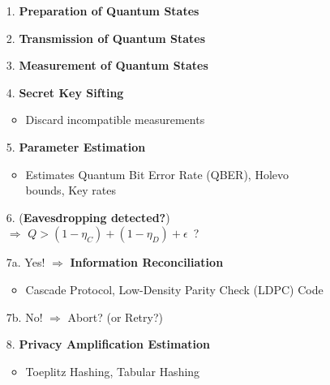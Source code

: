 \documentclass{beamer}
\begin{document}
\begin{frame}
\begin{figure}
\begin{minipage}{0.4\textwidth}
                \caption{\color{blue}{Figure 1: }\color{black}{Flowchart of a QKD protocol}}
                \label{fig:qkd-protocol-flowchart-3}
            \end{minipage}%
            \hspace{0.05\textwidth}%
            \begin{minipage}{0.55\textwidth}
                \begin{enumerate}\footnotesize
                    \item[1.] \textbf{Preparation of Quantum States}
                    \item[2.] \textbf{Transmission of Quantum States}
                    \item[3.] \textbf{Measurement of Quantum States}
                    \item[4.] \textbf{Secret Key Sifting}
                    \begin{itemize}\scriptsize
                        \item Discard incompatible measurements
                    \end{itemize}
                    \item[5.] \textbf{Parameter Estimation}
                    \begin{itemize}\scriptsize
                        \item Estimates Quantum Bit Error Rate (QBER), Holevo bounds, Key rates
                    \end{itemize}
                    \item[6.] (\textbf{Eavesdropping detected?})\\$\Rightarrow$ $Q > (1 - {\eta}_{C}) + (1 - {\eta}_{D}) + \epsilon$\ ?
                    \item[7a.] Yes! $\Rightarrow$ \textbf{Information Reconciliation}
                    \begin{itemize}\scriptsize
                        \item Cascade Protocol, Low-Density Parity Check (LDPC) Code
                    \end{itemize}
                    \item[7b.] No! $\Rightarrow$ Abort? (or Retry?)
                    \item[8.] \textbf{Privacy Amplification Estimation}
                    \begin{itemize}\scriptsize
                        \item Toeplitz Hashing, Tabular Hashing
                    \end{itemize}
                \end{enumerate}
            \end{minipage}
        \end{figure}

    \end{frame}
  
\end{document}

